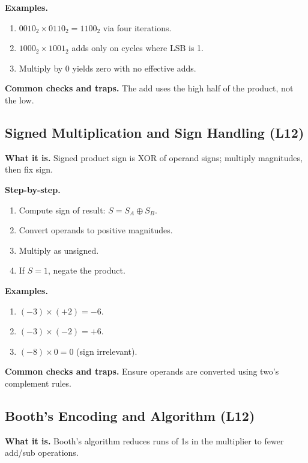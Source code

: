 \documentclass[11pt]{article}
\begin{document}
\textbf{Examples.}
\begin{enumerate}[leftmargin=*]
  \item $0010_2 \times 0110_2 = 1100_2$ via four iterations.
  \item $1000_2 \times 1001_2$ adds only on cycles where LSB is 1.
  \item Multiply by 0 yields zero with no effective adds.
\end{enumerate}

\textbf{Common checks and traps.} The add uses the high half of the product, not the low.

\begin{figure}[h]
\centering
{}
\end{figure}

\subsection{Signed Multiplication and Sign Handling (L12)}
\textbf{What it is.} Signed product sign is XOR of operand signs; multiply magnitudes, then fix sign.

\textbf{Step-by-step.}
\begin{enumerate}[leftmargin=*]
  \item Compute sign of result: $S = S_A \oplus S_B$.
  \item Convert operands to positive magnitudes.
  \item Multiply as unsigned.
  \item If $S=1$, negate the product.
\end{enumerate}

\textbf{Examples.}
\begin{enumerate}[leftmargin=*]
  \item $(-3) \times (+2) = -6$.
  \item $(-3) \times (-2) = +6$.
  \item $(-8) \times 0 = 0$ (sign irrelevant).
\end{enumerate}

\textbf{Common checks and traps.} Ensure operands are converted using two's complement rules.

\subsection{Booth's Encoding and Algorithm (L12)}
\textbf{What it is.} Booth's algorithm reduces runs of 1s in the multiplier to fewer add/sub operations.
\end{document}
